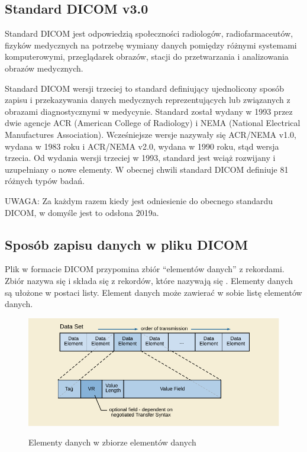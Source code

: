 \subsection{Standard DICOM v3.0}

\par
Standard DICOM jest odpowiedzią społeczności radiologów, radiofarmaceutów, fizyków medycznych na potrzebę wymiany danych pomiędzy różnymi systemami komputerowymi, przeglądarek obrazów,  stacji do przetwarzania i analizowania obrazów medycznych.

\par
Standard DICOM wersji trzeciej to standard definiujący ujednolicony sposób zapisu i przekazywania danych medycznych reprezentujących lub związanych z obrazami diagnostycznymi w medycynie.
Standard został wydany w 1993 przez dwie agencje ACR (American College of Radiology) i NEMA (National Electrical Manufactures Association).
Wcześniejsze wersje nazywały się ACR/NEMA v1.0, wydana w 1983 roku i ACR/NEMA v2.0, wydana w 1990 roku, stąd wersja trzecia.
Od wydania wersji trzeciej w 1993, standard jest wciąż rozwijany i uzupełniany o nowe elementy.
W obecnej chwili standard DICOM definiuje 81 różnych typów badań.

UWAGA: Za każdym razem kiedy jest odniesienie do obecnego standardu DICOM, w domyśle jest to odsłona 2019a.

\subsection{Sposób zapisu danych w pliku DICOM}

Plik w formacie DICOM przypomina zbiór \enquote{elementów danych} z rekordami.
Zbiór nazywa się  i składa się z rekordów, które nazywają się .
Elementy danych są ułożone w postaci listy.
Element danych może zawierać w sobie listę elementów danych.

\begin{figure}[!htbp]
    \caption{Elementy danych w zbiorze elementów danych}
    \includegraphics[]{img/dicom-dataelement001.pdf}
    \centering
    \label{fig:dicom-dataelement}
\end{figure}

